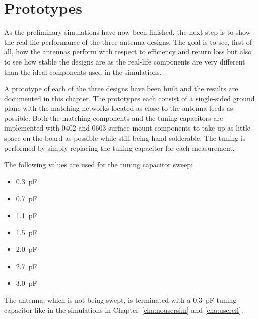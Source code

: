 \chapter{Prototypes}
\label{cha:prototypes}

As the preliminary simulations have now been finished, the next step is to show the real-life performance of the three antenna designs. The goal is to see, first of all, how the antennas perform with respect to efficiency and return loss but also to see how stable the designs are as the real-life components are very different than the ideal components used in the simulations.

A prototype of each of the three designs have been built and the results are documented in this chapter. The prototypes each consist of a single-sided ground plane with the matching networks located as close to the antenna feeds as possible. Both the matching components and the tuning capacitors are implemented with 0402 and 0603 surface mount components to take up as little space on the board as possible while still being hand-solderable. The tuning is performed by simply replacing the tuning capacitor for each measurement.

The following values are used for the tuning capacitor sweep:
\begin{itemize}
\item \SI{0.3}{pF}
\item \SI{0.7}{pF}
\item \SI{1.1}{pF}
\item \SI{1.5}{pF}
\item \SI{2.0}{pF}
\item \SI{2.7}{pF}
\item \SI{3.0}{pF}
\end{itemize}
The antenna, which is not being swept, is terminated with a \SI{0.3}{pF} tuning capacitor like in the simulations in Chapter~\ref{cha:nousersim} and \ref{cha:usereff}.

